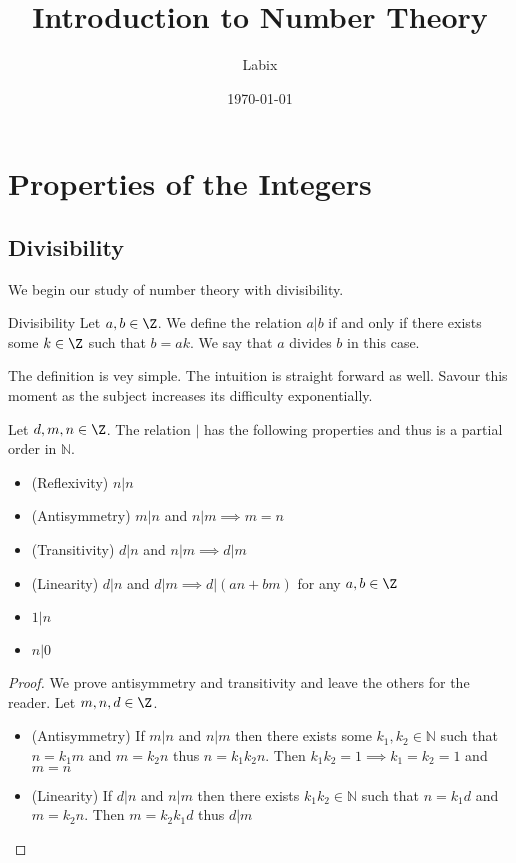 \documentclass[a4paper]{article}
\title{Introduction to Number Theory}
\author{Labix}
\date{\today}
\begin{document}
\maketitle
\begin{abstract}
\end{abstract}
\pagebreak
\tableofcontents
\pagebreak
\section{Properties of the Integers}
\subsection{Divisibility}
We begin our study of number theory with divisibility. 
\begin{defn}{Divisibility}{} Let $a,b\in\Z$. We define the relation $a|b$ if and only if there exists some $k\in\Z$ such that $b=ak$. We say that $a$ divides $b$ in this case. 
\end{defn}
The definition is vey simple. The intuition is straight forward as well. Savour this moment as the subject increases its difficulty exponentially.  

\begin{prp}{}{} Let $d,m,n\in\Z$. The relation $|$ has the following properties and thus is a partial order in $\mathbb{N}$. 
\begin{itemize}
\item (Reflexivity) $n|n$
\item (Antisymmetry) $m|n$ and $n|m\implies m=n$
\item (Transitivity) $d|n$ and $n|m\implies d|m$
\item (Linearity) $d|n$ and $d|m\implies d|(an+bm)$ for any $a,b\in\Z$
\item $1|n$
\item $n|0$
\end{itemize}\tcbline
\begin{proof} We prove antisymmetry and transitivity and leave the others for the reader. Let $m,n,d\in\Z$. 
\begin{itemize}
\item (Antisymmetry) If $m|n$ and $n|m$ then there exists some $k_1,k_2\in\mathbb{N}$ such that $n=k_1m$ and $m=k_2n$ thus $n=k_1k_2n$. Then $k_1k_2=1\implies k_1=k_2=1$ and $m=n$
\item (Linearity) If $d|n$ and $n|m$ then there exists $k_1k_2\in\mathbb{N}$ such that $n=k_1d$ and $m=k_2n$. Then $m=k_2k_1d$ thus $d|m$
\end{itemize}
\end{proof}
\end{prp}
\end{document}
